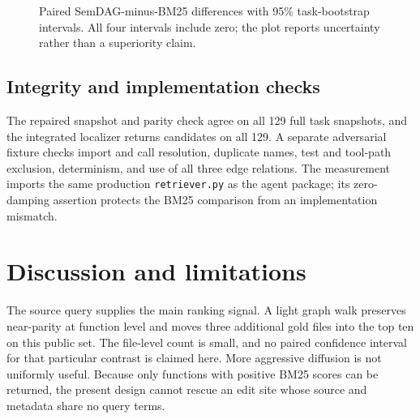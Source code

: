 \documentclass[11pt]{article}
\begin{document}
\begin{figure}[t]
\centering
{}
\caption{Paired SemDAG-minus-BM25 differences with 95\% task-bootstrap intervals. All four intervals include zero; the plot reports uncertainty rather than a superiority claim.}
\label{fig:ci}
\end{figure}

\subsection{Integrity and implementation checks}
The repaired snapshot and parity check agree on all 129 full task snapshots, and the integrated localizer returns candidates on all 129. A separate adversarial fixture checks import and call resolution, duplicate names, test and tool-path exclusion, determinism, and use of all three edge relations. The measurement imports the same production \texttt{retriever.py} as the agent package; its zero-damping assertion protects the BM25 comparison from an implementation mismatch.

\section{Discussion and limitations}
The source query supplies the main ranking signal. A light graph walk preserves near-parity at function level and moves three additional gold files into the top ten on this public set. The file-level count is small, and no paired confidence interval for that particular contrast is claimed here. More aggressive diffusion is not uniformly useful. Because only functions with positive BM25 scores can be returned, the present design cannot rescue an edit site whose source and metadata share no query terms.
\end{document}
